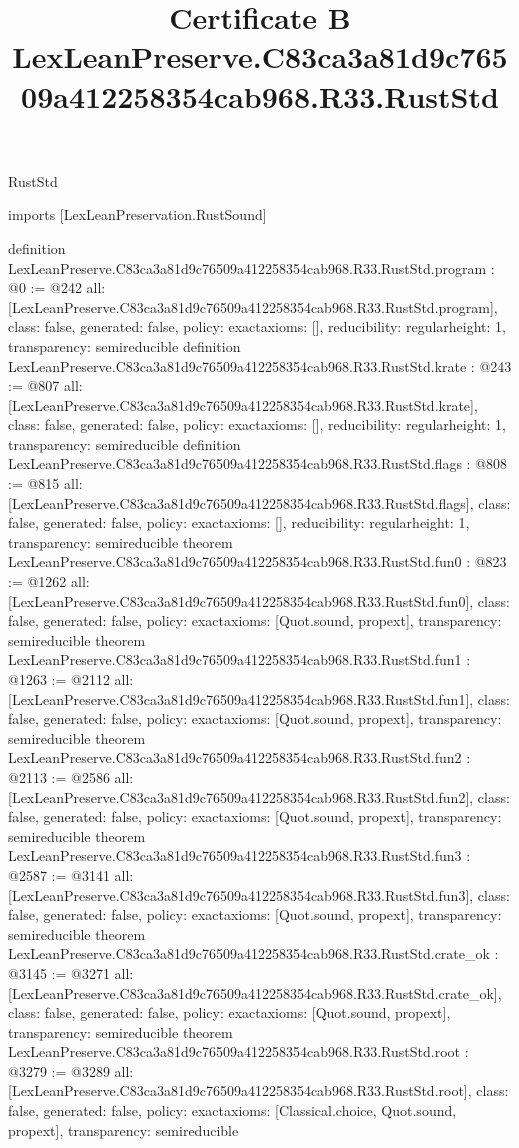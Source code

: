 \begin{lexlean}{RustStd}
\title{Certificate B LexLeanPreserve.C83ca3a81d9c76509a412258354cab968.R33.RustStd}
\begin{coremodule}
imports [LexLeanPreservation.RustSound]

definition LexLeanPreserve.C83ca3a81d9c76509a412258354cab968.R33.RustStd.program : @0 := @242 {
  all: [LexLeanPreserve.C83ca3a81d9c76509a412258354cab968.R33.RustStd.program],
  class: false,
  generated: false,
  policy: exact{axioms: []},
  reducibility: regular{height: 1},
  transparency: semireducible
}
definition LexLeanPreserve.C83ca3a81d9c76509a412258354cab968.R33.RustStd.krate : @243 := @807 {
  all: [LexLeanPreserve.C83ca3a81d9c76509a412258354cab968.R33.RustStd.krate],
  class: false,
  generated: false,
  policy: exact{axioms: []},
  reducibility: regular{height: 1},
  transparency: semireducible
}
definition LexLeanPreserve.C83ca3a81d9c76509a412258354cab968.R33.RustStd.flags : @808 := @815 {
  all: [LexLeanPreserve.C83ca3a81d9c76509a412258354cab968.R33.RustStd.flags],
  class: false,
  generated: false,
  policy: exact{axioms: []},
  reducibility: regular{height: 1},
  transparency: semireducible
}
theorem LexLeanPreserve.C83ca3a81d9c76509a412258354cab968.R33.RustStd.fun0 : @823 := @1262 {
  all: [LexLeanPreserve.C83ca3a81d9c76509a412258354cab968.R33.RustStd.fun0],
  class: false,
  generated: false,
  policy: exact{axioms: [Quot.sound, propext]},
  transparency: semireducible
}
theorem LexLeanPreserve.C83ca3a81d9c76509a412258354cab968.R33.RustStd.fun1 : @1263 := @2112 {
  all: [LexLeanPreserve.C83ca3a81d9c76509a412258354cab968.R33.RustStd.fun1],
  class: false,
  generated: false,
  policy: exact{axioms: [Quot.sound, propext]},
  transparency: semireducible
}
theorem LexLeanPreserve.C83ca3a81d9c76509a412258354cab968.R33.RustStd.fun2 : @2113 := @2586 {
  all: [LexLeanPreserve.C83ca3a81d9c76509a412258354cab968.R33.RustStd.fun2],
  class: false,
  generated: false,
  policy: exact{axioms: [Quot.sound, propext]},
  transparency: semireducible
}
theorem LexLeanPreserve.C83ca3a81d9c76509a412258354cab968.R33.RustStd.fun3 : @2587 := @3141 {
  all: [LexLeanPreserve.C83ca3a81d9c76509a412258354cab968.R33.RustStd.fun3],
  class: false,
  generated: false,
  policy: exact{axioms: [Quot.sound, propext]},
  transparency: semireducible
}
theorem LexLeanPreserve.C83ca3a81d9c76509a412258354cab968.R33.RustStd.crate_ok : @3145 := @3271 {
  all: [LexLeanPreserve.C83ca3a81d9c76509a412258354cab968.R33.RustStd.crate_ok],
  class: false,
  generated: false,
  policy: exact{axioms: [Quot.sound, propext]},
  transparency: semireducible
}
theorem LexLeanPreserve.C83ca3a81d9c76509a412258354cab968.R33.RustStd.root : @3279 := @3289 {
  all: [LexLeanPreserve.C83ca3a81d9c76509a412258354cab968.R33.RustStd.root],
  class: false,
  generated: false,
  policy: exact{axioms: [Classical.choice, Quot.sound, propext]},
  transparency: semireducible
}


\end{coremodule}
\end{lexlean}
